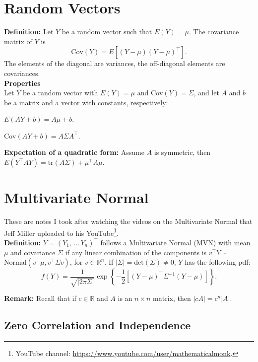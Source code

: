 \documentclass[letterpaper,11pt]{article}
\newenvironment{packed_item}{
\begin{itemize}
  \setlength{\itemsep}{1pt}
  \setlength{\parskip}{0pt}
  \setlength{\parsep}{0pt}
}{\end{itemize}}
\newcommand{\1}{\mathbf{1}} %
\begin{document}
\section{Random Vectors}
\textbf{Definition:} Let $Y$ be a random vector such that $E(Y) = \mu$. The covariance matrix of $Y$ is 
$$
\mathrm{Cov}(Y) = E[(Y-\mu)(Y-\mu)^\intercal].
$$
The elements of the diagonal are variances, the off-diagonal elements are covariances.  \\

\textbf{Properties} \\ 
Let $Y$ be a random vector with $E(Y)
= \mu$ and $\mathrm{Cov}(Y) = \Sigma$, and let $A$ and $b$ be a matrix
and a vector with constants, respectively:
\begin{packed_item}
\item $E(AY + b) = A \mu + b$. 
\item $\mathrm{Cov}(AY + b) = A \Sigma A^\intercal$.
\item \textbf{Expectation of a quadratic form:} Assume $A$ is symmetric, then $E(Y^\intercal A Y) = \mathrm{tr}(A\Sigma) + \mu^\intercal A \mu$.
\end{packed_item}


\section{Multivariate Normal}
These are notes I took after watching the videos on the 
Multivariate Normal that Jeff Miller uploaded to his YouTube\footnote{YouTube
  channel:
  \url{https://www.youtube.com/user/mathematicalmonk}.}. \\

\textbf{Definition:} $Y = (Y_1, \, ... \, Y_n)^\intercal$ follows a Multivariate Normal (MVN) with mean $\mu$ and covariance $\Sigma$ if any linear combination of the components is $v^\intercal Y \sim$ Normal$(v^\intercal \mu, v^\intercal \Sigma v)$, for $v \in \mathbb{R}^n$. If $|\Sigma| = \mathrm{det}(\Sigma) \neq 0$, $Y$ has the following pdf:
$$
f(Y) = \frac{1}{\sqrt{|2\pi\Sigma|}} \exp\left\{-\frac{1}{2}\left[ (Y-\mu)^\intercal \Sigma^{-1} (Y-\mu)\right] \right\}.
$$ 

\textbf{Remark:} Recall that if $c \in \mathbb{R}$ and $A$ is an $n \times n$ matrix, then $|c A| = c^n |A|$. 

\subsection{Zero Correlation and Independence}
\end{document}
